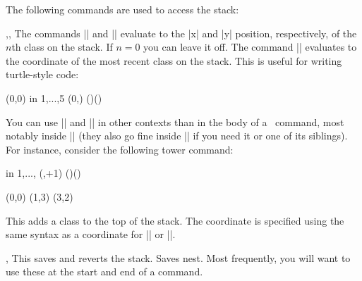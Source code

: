 \begin{sseqdata}[|| name = ex1, cohomological Serre grading]
The following commands are used to access the stack:

\begin{commandlist}{\lastx{},\lasty{},\lastclass{}}
The commands |\lastx| and |\lasty| evaluate to the |x| and |y| position, respectively, of the $n$th class on the stack. If $n = 0$ you can leave it off.
The command |\lastclass| evaluates to the coordinate of the most recent class on the stack. This is useful for writing turtle-style code:
\begin{codeexample}[width=6cm]
\DeclareSseqCommand {}
\DeclareSseqCommand {}
\begin{sseqpage}
\class(0,0)
\savestack
\foreach \y in { 1,...,5 }{
    \class(0,\y)
    \structline()(\lastclass)
}
\restorestack
\etaclass\etaclass\etaclass
\divtwoclass\divtwoclass
\end{sseqpage}
\end{codeexample}

You can use |\lastx| and |\lasty| in other contexts than in the body of a \sseqpages\ command, most notably inside |\sseqparseint| (they also go fine inside |\pgfmathparse| if you need it or one of its siblings). For instance, consider the following tower command:
\begin{codeexample}[width=6cm]
\DeclareSseqCommand \tower { } {
    \savestack
    \sseqparseint{}
    \foreach \n in {1,...,\numclasses}{
        \class(\lastx,\lasty+1)
        \structline()(\lastclass)
    }
    \restorestack
}
\begin{sseqpage}[y range = {0}{5}]
\class(0,0)\tower
\class(1,3)\tower
\class(3,2)\tower
\end{sseqpage}
\end{codeexample}
\end{commandlist}


\begin{command}{\pushstack{}}
This adds a class to the top of the stack. The coordinate is specified using the same syntax as a coordinate for |\structline| or |\replaceclass|.
\end{command}

\begin{commandlist}{\savestack,\restorestack}
This saves and reverts the stack. Saves nest. Most frequently, you will want to use these at the start and end of a command.
\end{commandlist}



\end{sseqdata}
